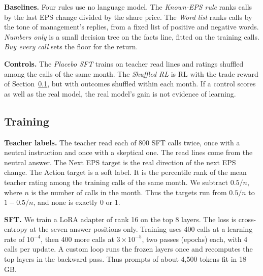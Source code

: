 \documentclass[sigconf,nonacm]{acmart}
\begin{document}
\textbf{Baselines.} Four rules use no language model.
The \emph{Known-EPS rule} ranks calls by the last EPS change divided by the share price.
The \emph{Word list} ranks calls by the tone of management's replies, from a fixed list of positive and negative words.
\emph{Numbers only} is a small decision tree on the facts line, fitted on the training calls.
\emph{Buy every call} sets the floor for the return.

\textbf{Controls.} The \emph{Placebo SFT} trains on teacher read lines and ratings shuffled among the calls of the same month.
The \emph{Shuffled RL} is RL with the trade reward of Section~\ref{sec:training}, but with outcomes shuffled within each month.
If a control scores as well as the real model, the real model's gain is not evidence of learning.

\subsection{Training}\label{sec:training}

\textbf{Teacher labels.} The teacher read each of 800 SFT calls twice, once with a neutral instruction and once with a skeptical one.
The read lines come from the neutral answer.
The Next EPS target is the real direction of the next EPS change.
The Action target is a soft label.
It is the percentile rank of the mean teacher rating among the training calls of the same month.
We subtract $0.5/n$, where $n$ is the number of calls in the month.
Thus the targets run from $0.5/n$ to $1-0.5/n$, and none is exactly 0 or 1.

\textbf{SFT.} We train a LoRA adapter of rank 16 on the top 8 layers.
The loss is cross-entropy at the seven answer positions only.
Training uses 400 calls at a learning rate of $10^{-4}$, then 400 more calls at $3\times10^{-5}$, two passes (epochs) each, with 4 calls per update.
A custom loop runs the frozen layers once and recomputes the top layers in the backward pass.
Thus prompts of about 4{,}500 tokens fit in 18\,GB.
\end{document}
